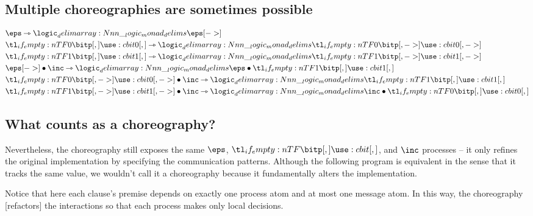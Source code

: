 \subsection{Multiple choreographies are sometimes possible}\label{sec:mult-chor-are}

\begin{align*}
  &\eps \lrimp \monad{\eps[->]} \\
  &\bit{0} \lrimp \monad{\bit{0}[->]} \\
  &\bit{1} \lrimp \monad{\bit{1}[->]} \\
  &\eps[->] \fuse \inc \lrimp \monad{\eps \fuse \bit{1}} \\
  &\bit{0}[->] \fuse \inc \lrimp \monad{\bit{1}} \\
  &\bit{1}[->] \fuse \inc \lrimp \monad{\inc \fuse \bit{0}}
\end{align*}


\subsection{What counts as a choreography?}\label{sec:what-counts-choreo}

Nevertheless, the choreography still exposes the same $\eps$, $\bit{}$, and $\inc$ processes -- it only refines the original implementation by specifying the communication patterns.
Although the following program is equivalent in the sense that it tracks the same value, we wouldn't call it a choreography because it fundamentally alters the implementation.



Notice that here each clause's premise depends on exactly one process atom and at most one message atom.
In this way, the choreography [refactors] the interactions so that each process makes only local decisions.









